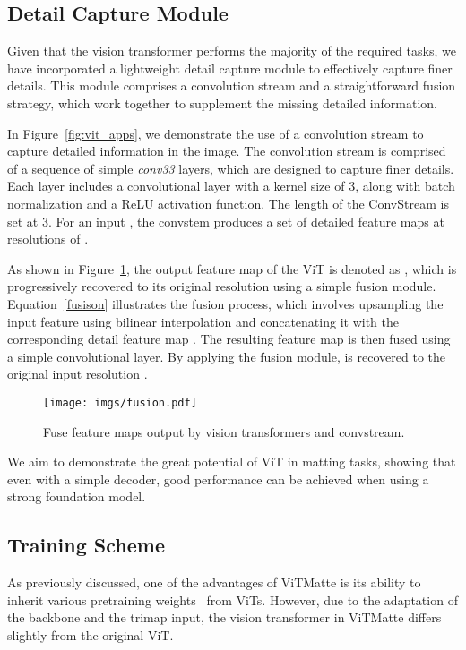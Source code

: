 \documentclass[10pt,twocolumn,letterpaper]{article}
\newcommand{\thename}{ViTMatte}
\begin{document}
\subsection{Detail Capture Module}
\label{Detail Capture Module}

Given that the vision transformer performs the majority of the required tasks, we have incorporated a lightweight detail capture module to effectively capture finer details. This module comprises a convolution stream and a straightforward fusion strategy, which work together to supplement the missing detailed information.

In Figure~\ref{fig:vit_apps}, we demonstrate the use of a convolution stream to capture detailed information in the image. The convolution stream is comprised of a sequence of simple \textit{conv33} layers, which are designed to capture finer details. Each layer includes a convolutional layer with a kernel size of 3, along with batch normalization and a ReLU activation function. The length of the ConvStream is set at 3. For an input , the convstem produces a set of detailed feature maps  at resolutions of .

As shown in Figure~\ref{fig:fusion}, the output feature map of the ViT is denoted as , which is progressively recovered to its original resolution using a simple fusion module. Equation~\eqref{fusison} illustrates the fusion process, which involves upsampling the input feature  using bilinear interpolation and concatenating it with the corresponding detail feature map . The resulting feature map is then fused using a simple convolutional layer. By applying the fusion module,  is recovered to the original input resolution .

\begin{figure}[tbp]
    \centering
    \texttt{[image: imgs/fusion.pdf]}
    \caption{Fuse feature maps output by vision transformers and convstream.}
    \label{fig:fusion}
\end{figure}



We aim to demonstrate the great potential of ViT in matting tasks, showing that even with a simple decoder, good performance can be achieved when using a strong foundation model. 

\subsection{Training Scheme}
\label{training}

As previously discussed, one of the advantages of \thename{} is its ability to inherit various pretraining weights~\cite{dino, ibot, he2022masked} from ViTs. However, due to the adaptation of the backbone and the trimap input, the vision transformer in \thename{} differs slightly from the original ViT.
\end{document}
